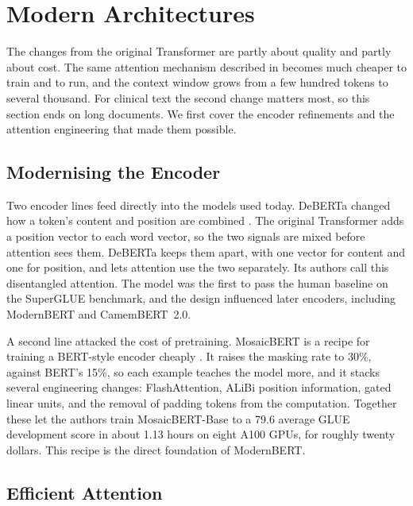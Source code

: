 \section{Modern Architectures}
\label{sec:lm-modern}

The changes from the original Transformer are partly about quality and partly about cost.
The same attention mechanism described in 
becomes much cheaper to train and to run, and the context window grows from a few hundred
tokens to several thousand. For clinical text the second change matters most, so this
section ends on long documents. We first cover the encoder refinements and the attention
engineering that made them possible.

\subsection{Modernising the Encoder}

Two encoder lines feed directly into the models used today. DeBERTa changed how a token's
content and position are combined \citep{deberta}. The original Transformer adds a
position vector to each word vector, so the two signals are mixed before attention sees
them. DeBERTa keeps them apart, with one vector for content and one for position, and lets
attention use the two separately. Its authors call this disentangled attention. The
model was the first to pass the human baseline on the SuperGLUE benchmark, and the design
influenced later encoders, including ModernBERT and CamemBERT~2.0.

A second line attacked the cost of pretraining. MosaicBERT is a recipe for training a
BERT-style encoder cheaply \citep{portes2023mosaicbert}. It raises the masking rate to
30\%, against BERT's 15\%, so each example teaches the model more, and it stacks several
engineering changes: FlashAttention, ALiBi position information, gated linear units, and
the removal of padding tokens from the computation. Together these let the authors train
MosaicBERT-Base to a 79.6 average GLUE development score in about 1.13 hours on eight A100 GPUs, for roughly twenty dollars. This
recipe is the direct foundation of ModernBERT.

\subsection{Efficient Attention}

